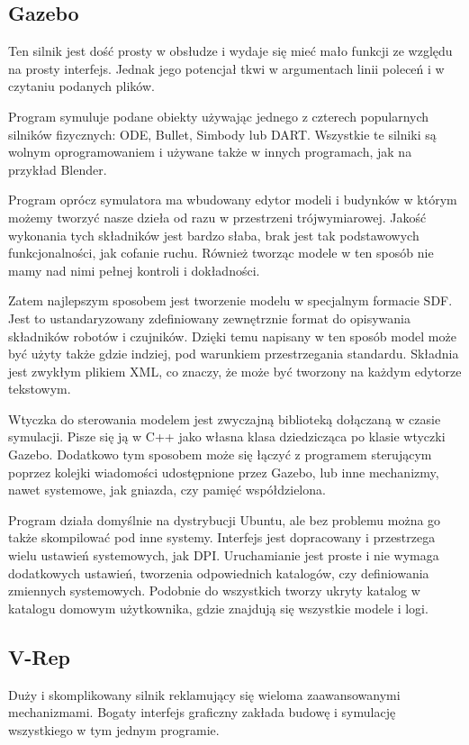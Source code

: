 \subsection{Gazebo}
Ten silnik jest dość prosty w obsłudze i wydaje się mieć mało funkcji ze względu na prosty interfejs.
Jednak jego potencjał tkwi w argumentach linii poleceń i w czytaniu podanych plików.

Program symuluje podane obiekty używając jednego z czterech popularnych silników fizycznych: ODE, Bullet, Simbody lub DART.
Wszystkie te silniki są wolnym oprogramowaniem i używane także w innych programach, jak na przykład Blender.

Program oprócz symulatora ma wbudowany edytor modeli i budynków w którym możemy tworzyć nasze dzieła od razu w przestrzeni trójwymiarowej.
Jakość wykonania tych składników jest bardzo słaba, brak jest tak podstawowych funkcjonalności, jak cofanie ruchu.
Również tworząc modele w ten sposób nie mamy nad nimi pełnej kontroli i dokładności.

Zatem najlepszym sposobem jest tworzenie modelu w specjalnym formacie SDF. Jest to ustandaryzowany zdefiniowany zewnętrznie format do opisywania składników robotów i czujników.
Dzięki temu napisany w ten sposób model może być użyty także gdzie indziej, pod warunkiem przestrzegania standardu.
Składnia jest zwykłym plikiem XML, co znaczy, że może być tworzony na każdym edytorze tekstowym.

Wtyczka do sterowania modelem jest zwyczajną biblioteką dołączaną w czasie symulacji. 
Pisze się ją w C++ jako własna klasa dziedzicząca po klasie wtyczki Gazebo.
Dodatkowo tym sposobem może się łączyć z programem sterującym poprzez kolejki wiadomości udostępnione przez Gazebo, lub inne mechanizmy, nawet systemowe, jak gniazda, czy pamięć współdzielona.

Program działa domyślnie na dystrybucji Ubuntu, ale bez problemu można go także skompilować pod inne systemy.
Interfejs jest dopracowany i przestrzega wielu ustawień systemowych, jak DPI.
Uruchamianie jest proste i nie wymaga dodatkowych ustawień, tworzenia odpowiednich katalogów, czy definiowania zmiennych systemowych.
Podobnie do wszystkich tworzy ukryty katalog w katalogu domowym użytkownika, gdzie znajdują się wszystkie modele i logi.

\subsection{V-Rep}
Duży i skomplikowany silnik reklamujący się wieloma zaawansowanymi mechanizmami.
Bogaty interfejs graficzny zakłada budowę i symulację wszystkiego w tym jednym programie.


